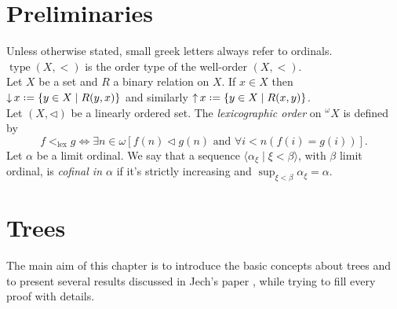\documentclass[12pt,a4paper]{report}
\theoremstyle{definition}
\theoremstyle{num.custom-title}
\DeclareMathOperator{\type}{type}
\DeclareMathOperator{\down}{\downarrow}
\DeclareMathOperator{\up}{\uparrow}
\newcommand*{\defeq}{\mathrel{\rlap{%
                     \raisebox{0.3ex}{$\cdot$}}%
                     \raisebox{-0.3ex}{$\cdot$}}%
                     =}
\renewcommand{\iff}{\Leftrightarrow}
\begin{document}

\chapter*{Preliminaries}

Unless otherwise stated, small greek letters always refer to ordinals.\\
$\type (X,<)$ is the order type of the well-order $(X,<)$.\\
Let $X$ be a set and $R$ a binary relation on $X$. If $x \in X$ then $\down x \defeq \{y \in X \mid R(y,x)\}$ and similarly $\up x \defeq \{y \in X \mid R(x,y)\}$.\\
Let $(X,\lhd)$ be a linearly ordered set. The \emph{lexicographic order} on $^{\omega} X$ is defined by
\[
f <_{\text{lex}} g \iff \exists n \in \omega [f(n) \lhd g(n) \text{ and } \forall i < n (f(i)=g(i))].
\]
Let $\alpha$ be a limit ordinal. We say that a sequence $\langle \alpha_\xi \mid \xi < \beta \rangle$, with $\beta$ limit ordinal, is \emph{cofinal in $\alpha$} if it's strictly increasing and $\sup_{\xi < \beta} \alpha_\xi = \alpha$.

\chapter{Trees}

The main aim of this chapter is to introduce the basic concepts about trees and to present several results discussed in Jech's paper \cite{Jec1971}, while trying to fill every proof with details.
\end{document}
